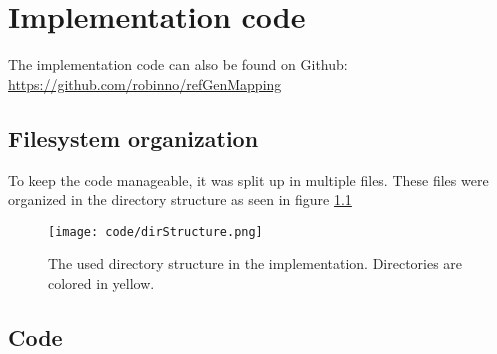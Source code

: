 \chapter{Implementation code}

The implementation code can also be found on Github: \href{https://github.com/robinno/refGenMapping}{https://github.com/robinno/refGenMapping}

\section{Filesystem organization}

To keep the code manageable, it was split up in multiple files. These files were organized in the directory structure as seen in figure \ref{fig:dirStruct}

\begin{figure}[H]
	\centering
	\texttt{[image: code/dirStructure.png]}
	\caption{The used directory structure in the implementation. Directories are colored in yellow.}
	\label{fig:dirStruct}
\end{figure}

\section{Code}

